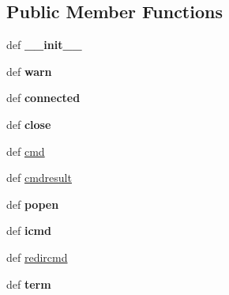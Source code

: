 \subsection*{Public Member Functions}
\begin{DoxyCompactItemize}
\item 
\hypertarget{classcore_1_1netns_1_1vnodeclient_1_1_vnode_client_a47c4aeb456b904ec9dac27d834d64157}{def {\bfseries \+\_\+\+\_\+init\+\_\+\+\_\+}}\label{classcore_1_1netns_1_1vnodeclient_1_1_vnode_client_a47c4aeb456b904ec9dac27d834d64157}

\item 
\hypertarget{classcore_1_1netns_1_1vnodeclient_1_1_vnode_client_aacdb4a4d253da6b687e65bb587ebef72}{def {\bfseries warn}}\label{classcore_1_1netns_1_1vnodeclient_1_1_vnode_client_aacdb4a4d253da6b687e65bb587ebef72}

\item 
\hypertarget{classcore_1_1netns_1_1vnodeclient_1_1_vnode_client_af6213941c8ced5c7e2e638e777369567}{def {\bfseries connected}}\label{classcore_1_1netns_1_1vnodeclient_1_1_vnode_client_af6213941c8ced5c7e2e638e777369567}

\item 
\hypertarget{classcore_1_1netns_1_1vnodeclient_1_1_vnode_client_a4abffa3b3453690cafa8e8daf8d629a9}{def {\bfseries close}}\label{classcore_1_1netns_1_1vnodeclient_1_1_vnode_client_a4abffa3b3453690cafa8e8daf8d629a9}

\item 
def \hyperlink{classcore_1_1netns_1_1vnodeclient_1_1_vnode_client_ab64673e0b2a3e3a5880ec1da899b5c8d}{cmd}
\item 
def \hyperlink{classcore_1_1netns_1_1vnodeclient_1_1_vnode_client_a0c87bbce6fee24b5a748fa40985fef1b}{cmdresult}
\item 
\hypertarget{classcore_1_1netns_1_1vnodeclient_1_1_vnode_client_a7c1b8eab64eec989ffb29c500b2c1d51}{def {\bfseries popen}}\label{classcore_1_1netns_1_1vnodeclient_1_1_vnode_client_a7c1b8eab64eec989ffb29c500b2c1d51}

\item 
\hypertarget{classcore_1_1netns_1_1vnodeclient_1_1_vnode_client_a56384c3dcc9c1f798567c993449d3052}{def {\bfseries icmd}}\label{classcore_1_1netns_1_1vnodeclient_1_1_vnode_client_a56384c3dcc9c1f798567c993449d3052}

\item 
def \hyperlink{classcore_1_1netns_1_1vnodeclient_1_1_vnode_client_a2ef69be66ba75dcbfaae7bcacd33ddc8}{redircmd}
\item 
\hypertarget{classcore_1_1netns_1_1vnodeclient_1_1_vnode_client_af00b889c3315072eb0f1011554e8cfce}{def {\bfseries term}}\label{classcore_1_1netns_1_1vnodeclient_1_1_vnode_client_af00b889c3315072eb0f1011554e8cfce}


\end{DoxyCompactItemize}
